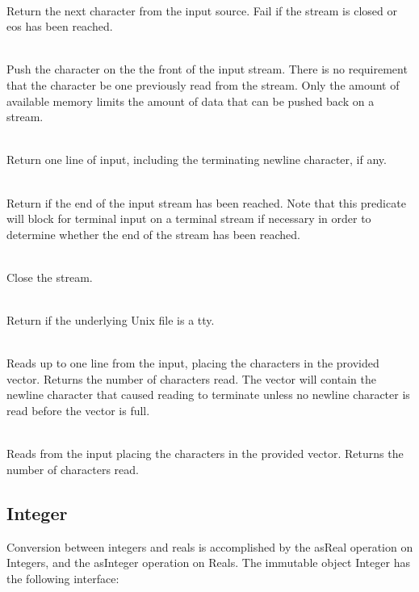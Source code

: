 \begin{desc}
  \item[\kw{operation} getChar \returns{} \/\LB{}\tn{Character}\/\RB{}]~\\
    Return the next character from the input source.  Fail if the stream is
    closed or eos has been reached.
  \item[\kw{operation} unGetChar\/\LB{}c \CO{} \tn{Character}\/\RB{}]~\\
    Push the character on the the front of the input stream.  There is no
    requirement that the character be one previously read from the stream.
    Only the amount of available memory limits the amount of data that can
    be pushed back on a stream.
  \item[\kw{operation} getString \returns{} \/\LB{}\tn{String}\/\RB{}]~\\
    Return one line of input, including the terminating newline
    character, if any.
  \item[\kw{function} eos \returns{} \/\LB{}\tn{Boolean}\/\RB{}]~\\
    Return  if the end of the input stream has been reached.  Note
    that this predicate will block for terminal input on a terminal stream
    if necessary in order to determine whether the end of the stream has
    been reached.
  \item[\kw{operation} close]~\\
    Close the stream.
  \item[\kw{function} isAtty \returns{} \/\LB{}\tn{Boolean}\/\RB{}]~\\
    Return  if the underlying Unix file is a tty.
  \item[\kw{operation} fillVector\/\LB{}VectorOfChar\/\RB{} \returns{} \/\LB{}Integer\/\RB{}]~\\
    Reads up to one line from the input, placing the characters in the
    provided vector.  Returns the number of characters read.  The vector
    will contain the newline character that caused reading to terminate
    unless no newline
    character is read before the vector is full.
  \item[\kw{operation} rawRead\/\LB{}VectorOfChar\/\RB{} \returns{} \/\LB{}Integer\/\RB{}]~\\
    Reads from the input placing the characters in the
    provided vector.  Returns the number of characters read.
\end{desc}

\subsection{Integer}
\label{builtin Integer}
Conversion between integers and reals is accomplished by the asReal
operation on Integers, and the asInteger operation on Reals.
The immutable object Integer has the following interface:

